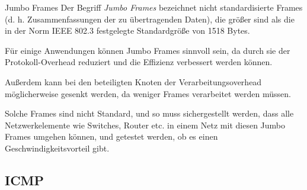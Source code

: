 \begin{bonus}{Jumbo Frames}
    Der Begriff \emph{Jumbo Frames} bezeichnet nicht standardisierte Frames (d. h. Zusammenfassungen der zu übertragenden Daten), die größer sind als die in der Norm IEEE 802.3 festgelegte Standardgröße von 1518 Bytes.

    Für einige Anwendungen können Jumbo Frames sinnvoll sein, da durch sie der Protokoll-Overhead reduziert und die Effizienz verbessert werden können.

    Außerdem kann bei den beteiligten Knoten der Verarbeitungsoverhead möglicherweise gesenkt werden, da weniger Frames verarbeitet werden müssen.

    Solche Frames sind nicht Standard, und so muss sichergestellt werden, dass alle Netzwerkelemente wie Switches, Router etc. in einem Netz mit diesen Jumbo Frames umgehen können, und getestet werden, ob es einen Geschwindigkeitsvorteil gibt.
\end{bonus}

\subsection{ICMP}

